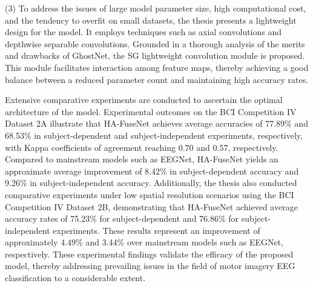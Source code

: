 (3) To address the issues of large model parameter size, high computational cost, and the tendency to overfit on small datasets, the thesis presents a lightweight design for the model. It employs techniques such as axial convolutions and depthwise separable convolutions. Grounded in a thorough analysis of the merits and drawbacks of GhostNet, the SG lightweight convolution module is proposed. This module facilitates interaction among feature maps, thereby achieving a good balance between a reduced parameter count and maintaining high accuracy rates.

Extensive comparative experiments are conducted to ascertain the optimal architecture of the model. Experimental outcomes on the BCI Competition IV Dataset 2A illustrate that HA-FuseNet achieves average accuracies of 77.89\% and 68.53\% in subject-dependent and subject-independent experiments, respectively, with Kappa coefficients of agreement reaching 0.70 and 0.57, respectively. Compared to mainstream models such as EEGNet, HA-FuseNet yields an approximate average improvement of 8.42\% in subject-dependent accuracy and 9.26\% in subject-independent accuracy. Additionally, the thesis also conducted comparative experiments under low spatial resolution scenarios using the BCI Competition IV Dataset 2B, demonstrating that HA-FuseNet achieved average accuracy rates of 75.23\% for subject-dependent and 76.86\% for subject-independent experiments. These results represent an improvement of approximately 4.49\% and 3.44\% over mainstream models such as EEGNet, respectively. These experimental findings validate the efficacy of the proposed model, thereby addressing prevailing issues in the field of motor imagery EEG classification to a considerable extent.